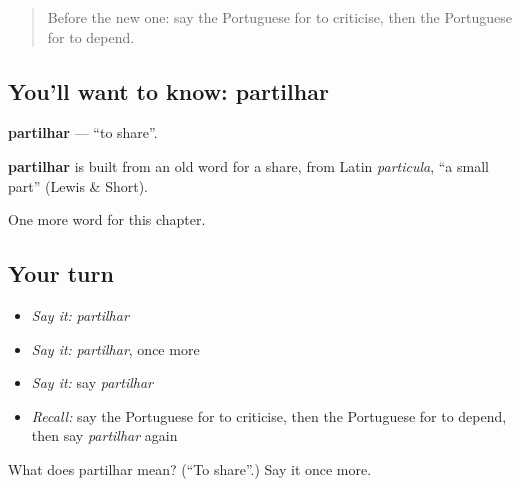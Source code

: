 \begin{quote}
Before the new one: say the Portuguese for to criticise, then the Portuguese for to depend.
\end{quote}

\subsection*{You'll want to know: partilhar}
\textbf{partilhar} — \textquotedblleft{}to share\textquotedblright{}.

\begin{cousinweb}
\textbf{partilhar} is built from an old word for a share, from Latin \emph{particula}, \textquotedblleft{}a small part\textquotedblright{} (Lewis \& Short).
\end{cousinweb}

\begin{grammarlens}[title={What you've built}]
One more word for this chapter.
\end{grammarlens}

\subsection*{Your turn}
\begin{itemize}
\raggedright
  \item \emph{Say it:} \emph{partilhar}
  \item \emph{Say it:} \emph{partilhar}, once more
  \item \emph{Say it:} say \emph{partilhar}
  \item \emph{Recall:} say the Portuguese for to criticise, then the Portuguese for to depend, then say \emph{partilhar} again
\end{itemize}

\begin{tcolorbox}[breakable,colback=teal!4,colframe=teal!35!black,title={Before you move on}]
What does partilhar mean? (\textquotedblleft{}To share\textquotedblright{}.) Say it once more.
\end{tcolorbox}
